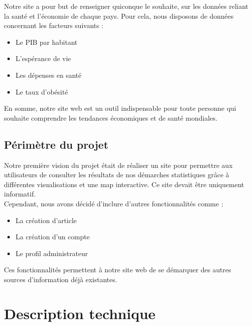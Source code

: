 \documentclass[12pt,a4paper]{report}
\begin{document}
Notre site a pour but de renseigner quiconque le souhaite, sur les données reliant la santé et l'économie de chaque pays. Pour cela, nous disposons de données concernant les facteurs suivants :

\begin{itemize}
\item Le PIB par habitant
\item L'espérance de vie
\item Les dépenses en santé
\item Le taux d'obésité \\
\end{itemize}

En somme, notre site web est un outil indispensable pour toute personne qui souhaite comprendre les tendances économiques et de santé mondiales.

\section{Périmètre du projet}
    Notre première vision du projet était de réaliser un site pour permettre aux utilisateurs de consulter les résultats de nos démarches statistiques grâce à différentes visualisations et une map interactive. Ce site devait être uniquement informatif. \\

    Cependant, nous avons décidé d'inclure d'autres fonctionnalités comme :
\begin{itemize}
    \item La création d’article
    \item La création d’un compte 
    \item Le profil administrateur \\
\end{itemize}
    
    Ces fonctionnalités permettent à notre site web de se démarquer des autres sources d'information déjà existantes. 

\chapter{Description technique}
\vspace{-1.5cm}
\end{document}
